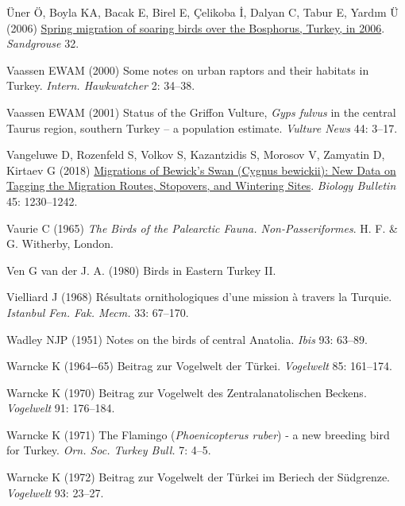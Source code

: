 \documentclass[
  letterpaper,
  DIV=11,
  numbers=noendperiod]{scrreprt}
\newlength{\cslhangindent}
\newenvironment{CSLReferences}[2] %
 {\begin{list}{}{%
  \setlength{\itemindent}{0pt}
  \setlength{\leftmargin}{0pt}
  \setlength{\parsep}{0pt}
  \ifodd #1
   \setlength{\leftmargin}{\cslhangindent}
   \setlength{\itemindent}{-1\cslhangindent}
  \fi
  \setlength{\itemsep}{#2\baselineskip}}}
 {\end{list}}
\begin{document}
\begin{CSLReferences}{0}{1}
Üner Ö, Boyla KA, Bacak E, Birel E, Çelikoba İ, Dalyan C, Tabur E,
Yardım Ü (2006) \href{https://osme.org/sandgrouse/}{{Spring migration of
soaring birds over the Bosphorus, Turkey, in 2006}}. \emph{Sandgrouse}
32.

Vaassen EWAM (2000) {Some notes on urban raptors and their habitats in
Turkey}. \emph{Intern. Hawkwatcher} 2: 34--38.

Vaassen EWAM (2001) {Status of the Griffon Vulture, \emph{Gyps fulvus}
in the central Taurus region, southern Turkey -- a population estimate}.
\emph{Vulture News} 44: 3--17.

Vangeluwe D, Rozenfeld S, Volkov S, Kazantzidis S, Morosov V, Zamyatin
D, Kirtaev G (2018)
\href{https://doi.org/10.1134/S1062359018070178}{{Migrations of Bewick's
Swan (Cygnus bewickii): New Data on Tagging the Migration Routes,
Stopovers, and Wintering Sites}}. \emph{Biology Bulletin} 45:
1230--1242.

Vaurie C (1965) \emph{{The Birds of the Palearctic Fauna.
Non-Passeriformes}}. H. F. \& G. Witherby, London.

Ven G van der J. A. (1980) {Birds in Eastern Turkey II}.

Vielliard J (1968) {Résultats ornithologiques d'une mission à travers la
Turquie}. \emph{Istanbul Fen. Fak. Mecm.} 33: 67--170.

Wadley NJP (1951) {Notes on the birds of central Anatolia}. \emph{Ibis}
93: 63--89.

Warncke K (1964-\/-65) {Beitrag zur Vogelwelt der Türkei}.
\emph{Vogelwelt} 85: 161--174.

Warncke K (1970) {Beitrag zur Vogelwelt des Zentralanatolischen
Beckens}. \emph{Vogelwelt} 91: 176--184.

Warncke K (1971) {The Flamingo (\emph{Phoenicopterus ruber}) - a new
breeding bird for Turkey}. \emph{Orn. Soc. Turkey Bull.} 7: 4--5.

Warncke K (1972) {Beitrag zur Vogelwelt der Türkei im Beriech der
Südgrenze}. \emph{Vogelwelt} 93: 23--27.


\end{CSLReferences}
\end{document}
